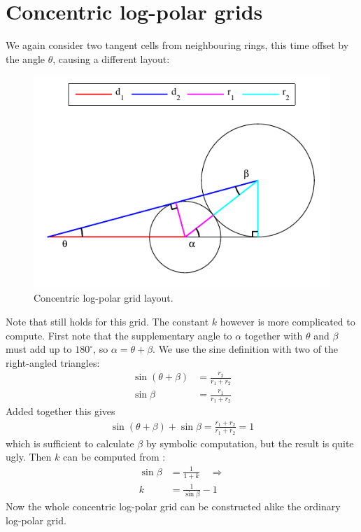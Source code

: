 \documentclass[thesis.tex]{subfiles}
\begin{document}
\section{Concentric log-polar grids}
%
We again consider two tangent cells from neighbouring rings, this time offset by the angle $\theta$, causing a different layout:
%
\begin{figure}[H]
	\centering
	\includegraphics[width=\textwidth]{img/gridLayoutDerivationConcentric.pdf}
    \caption{Concentric log-polar grid layout.}
    \label{fig:gridLayoutDerivationNormal}
\end{figure}
\noindent
%
Note that  still holds for this grid. The constant $k$ however is more complicated to compute. First note that the supplementary angle to $\alpha$ together with $\theta$ and $\beta$ must add up to $180^\circ$, so $\alpha = \theta + \beta$. We use the sine definition with two of the right-angled triangles:
%
\begin{align}
\sin (\theta + \beta) &= \frac{r_2}{r_1 + r_2} \nonumber \\
\sin \beta &= \frac{r_1}{r_1 + r_2} \label{eq:kFromBeta}
\end{align}
%
Added together this gives
%
\begin{align*}
\sin (\theta + \beta) + \sin \beta = \frac{r_1 + r_2}{r_1 + r_2} = 1
\end{align*}
%
which is sufficient to calculate $\beta$ by symbolic computation, but the result is quite ugly. Then $k$ can be computed from :
%
\begin{align*}
\sin \beta &= \frac{1}{1 + k} \quad\Rightarrow \\
k &= \frac{1}{\sin \beta} - 1
\end{align*}
%
Now the whole concentric log-polar grid can be constructed alike the ordinary log-polar grid.
%
\subbibliography
\end{document}
